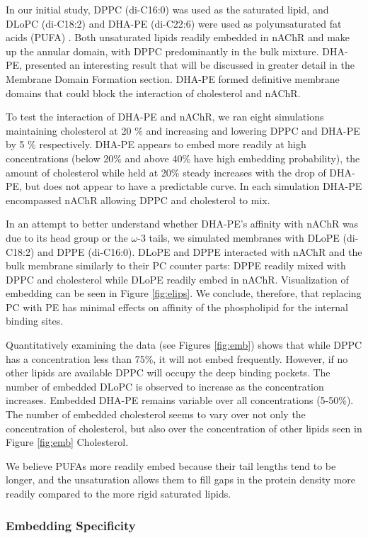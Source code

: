 \documentclass[10pt, letterpaper]{article}
\begin{document}
In our initial study, DPPC (di-C16:0) was used as the saturated lipid, and DLoPC (di-C18:2) and DHA-PE (di-C22:6) were used as polyunsaturated fat acids (PUFA) . Both unsaturated lipids readily embedded in nAChR and make up the annular domain, with DPPC predominantly in the bulk mixture. DHA-PE, presented an interesting result that will be discussed in greater detail in the Membrane Domain Formation section. DHA-PE formed definitive membrane domains that could block the interaction of cholesterol and nAChR.

To test the interaction of DHA-PE and nAChR, we ran eight simulations maintaining cholesterol at 20 $\%$ and increasing and lowering DPPC and DHA-PE by 5 $\%$ respectively. DHA-PE appears to embed more readily at high concentrations (below 20\% and above 40\% have high embedding probability), the amount of cholesterol while held at 20\% steady increases with the drop of DHA-PE, but does not appear to have a predictable curve. In each simulation DHA-PE encompassed nAChR allowing DPPC and cholesterol to mix.

In an attempt to better understand whether DHA-PE's affinity with nAChR was due to its head group or the $\omega$-3 tails, we simulated membranes with DLoPE (di-C18:2) and DPPE (di-C16:0). DLoPE and DPPE interacted with nAChR and the bulk membrane similarly to their PC counter parts: DPPE readily mixed with DPPC and cholesterol while DLoPE readily embed in nAChR. Visualization of embedding can be seen in Figure \ref{fig:elips}. We conclude, therefore, that replacing PC with PE has minimal effects on affinity of the phospholipid for the internal binding sites. 

Quantitatively examining the data (see Figures \ref{fig:emb}) shows that while DPPC has a concentration less than 75\%, it will not embed frequently. However, if no other lipids are available DPPC will occupy the deep binding pockets. The number of embedded DLoPC is observed to increase as the concentration increases. Embedded DHA-PE remains variable over all concentrations (5-50\%). The number of embedded cholesterol seems to vary over not only the concentration of cholesterol, but also over the concentration of other lipids seen in Figure \ref{fig:emb} Cholesterol.

We believe PUFAs more readily embed because their tail lengths tend to be longer, and the unsaturation allows them to fill gaps in the protein density more readily compared to the more rigid saturated lipids.

\subsubsection{Embedding Specificity}
\end{document}
